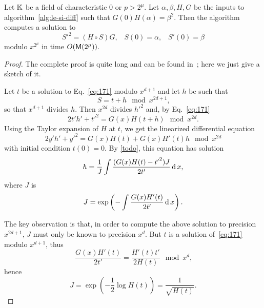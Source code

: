 \begin{theorem}
  Let $\mathbb{K}$ be a field of characteristic $0$ or $p>2^\mu$. Let
  $\alpha,\beta,H,G$ be the inputs to algorithm~\ref{alg:le-si-diff}
  such that $G(0)H(\alpha)=\beta^2$. Then the algorithm computes a
  solution to
  \begin{equation}
    \label{eq:171}
    {S'}^2 = (H\circ S)G
    \text{,}\quad
    S(0) = \alpha
    \text{,}\quad
    S'(0) = \beta
  \end{equation}
  modulo $x^{2^\mu}$ in time $O(\mathsf{M}(2^{\mu}))$.
\end{theorem}
\begin{proof}
  The complete proof is quite long and can be found
  in~\cite{lercier+sirvent08}; here we just give a sketch of it.

  Let $t$ be a solution to Eq.~\eqref{eq:171} modulo $x^{d+1}$ and let
  $h$ be such that 
  \begin{equation}
    \label{eq:175}
    S = t + h \mod x^{2d+1}
    \text{,}
  \end{equation}
  so that $x^{d+1}$ divides $h$.  Then $x^{2d}$ divides ${h'}^2$ and,
  by Eq.~\eqref{eq:171}
  \begin{equation}
    \label{eq:176}
    2t'h' + {t'}^2 = G(x)H(t+h) \mod x^{2d}
    \text{.}
  \end{equation}
  Using the Taylor expansion of $H$ at $t$, we get the linearized
  differential equation
  \begin{equation}
    \label{eq:177}
    2y'h' + {y'}^2 = G(x)H(t) + G(x)H'(t)h
    \mod x^{2d}
  \end{equation}
  with initial condition $t(0)=0$. By \ref{todo}, this equation has
  solution
  \begin{equation}
    \label{eq:178}
    h = \frac{1}{J} \int \frac{(G(x)H(t) - {t'}^2)J}{2t'}\operatorname{d} x
    \text{,}
  \end{equation}
  where $J$ is 
  \begin{equation}
    \label{eq:179}
    J=\exp\left(-\int\frac{G(x)H'(t)}{2t'}\operatorname{d} x\right)
    \text{.}
  \end{equation}

  The key observation is that, in order to compute the above solution
  to precision $x^{2d+1}$, $J$ must only be known to precision
  $x^d$. But $t$ is a solution of~\eqref{eq:171} modulo $x^{d+1}$, thus 
  \begin{equation}
    \label{eq:172}
    \frac{G(x)H'(t)}{2t'} = \frac{H'(t)t'}{2H(t)} \mod x^d
    \text{,}
  \end{equation}
  hence
  \begin{equation}
    \label{eq:173}
    J = \exp\left(-\frac{1}{2}\log H(t)\right) = \frac{1}{\sqrt{H(t)}}
    \text{.}
  \end{equation}


\end{proof}
